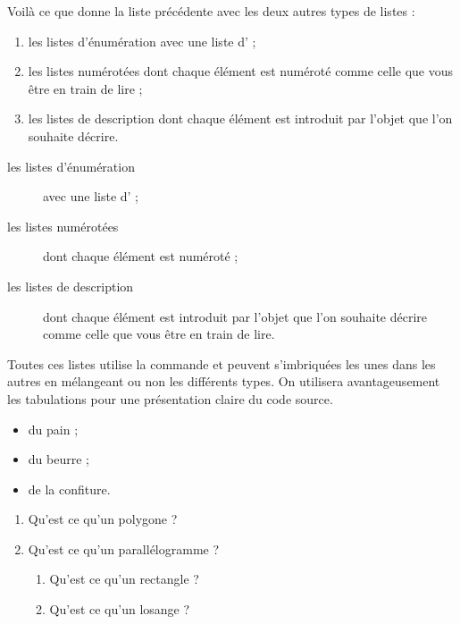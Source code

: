 Voilà ce que donne la liste précédente avec les deux autres types de listes :\medskip

\begin{enumerate}[font=\mdseries,label=\arabic*.]
    \item les listes d'énumération avec une liste d' ;
    \item les listes numérotées dont chaque élément est numéroté comme celle que vous être en train de lire ;
    \item les listes de description dont chaque élément est introduit par l'objet que l'on souhaite décrire.
\end{enumerate}\medskip

\begin{description}
    \item[les listes d'énumération] avec une liste d' ;
    \item[les listes numérotées] dont chaque élément est numéroté ;
    \item[les listes de description] dont chaque élément est introduit par l'objet que l'on souhaite décrire comme celle que vous être en train de lire.
\end{description}\medskip

Toutes ces listes utilise la commande  et peuvent s'imbriquées les unes dans les autres en mélangeant ou non les différents types. On utilisera avantageusement les tabulations pour une présentation claire du code source.\bigskip

{\NewFont\reset
\begin{SideBySideExample}
    \begin{itemize}
        \item du pain ;
        \item du beurre ;
        \item de la confiture.
    \end{itemize}
\end{SideBySideExample}
\bigskip}

{\NewFont\reset
\begin{SideBySideExample}
    \begin{enumerate}
        \item Qu'est ce qu'un polygone ?
        \item Qu'est ce qu'un parall\'elogramme ?
            \begin{enumerate}
                \item Qu'est ce qu'un rectangle ?
                \item Qu'est ce qu'un losange ?
            \end{enumerate}
    \end{enumerate}
\end{SideBySideExample}
\bigskip}

